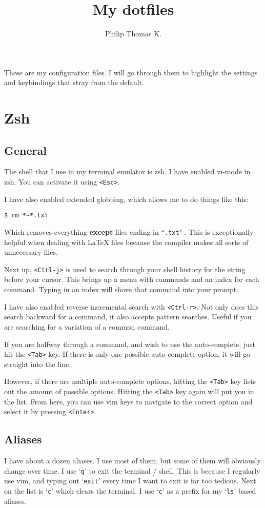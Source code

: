 \documentclass[12pt, a4paper]{article}
\title{My dotfiles}
\author{Philip Thomas K.}
\begin{document}
\maketitle

These are my configuration files.
I will go through them to highlight the settings and keybindings that stray from the default.

\section{Zsh}

\subsection{General}

The shell that I use in my terminal emulator is zsh.
I have enabled vi-mode in zsh.
You can activate it using \texttt{<Esc>}.

I have also enabled extended globbing, which allows me to do things like this:

\begin{center}
\verb|$ rm *~*.txt|
\end{center}

Which removes everything \textbf{except} files ending in ``\texttt{.txt}" .
This is exceptionally helpful when dealing with \LaTeX{} files because the compiler makes all sorts of unnecessary files.

Next up, \texttt{<Ctrl-j>} is used to search through your shell history for the string before your cursor.
This brings up a menu with commands and an index for each command.
Typing in an index will shove that command into your prompt.

I have also enabled reverse incremental search with \texttt{<Ctrl-r>}.
Not only does this search backward for a command, it also accepts pattern searches.
Useful if you are searching for a variation of a common command.

If you are halfway through a command, and wish to use the auto-complete, just hit the \texttt{<Tab>} key.
If there is only one possible auto-complete option, it will go straight into the line.

However, if there are multiple auto-complete options, hitting the \texttt{<Tab>} key lists out the amount of possible options.
Hitting the \texttt{<Tab>} key again will put you in the list.
From here, you can use vim keys to navigate to the correct option and select it by pressing \texttt{<Enter>}.

\subsection{Aliases}

I have about a dozen aliases.
I use most of them, but some of them will obviously change over time.
I use `\texttt{q}' to exit the terminal / shell.
This is because I regularly use vim, and typing out `\texttt{exit}' every time I want to exit is far too tedious.
Next on the list is `\texttt{c}' which clears the terminal.
I use `\texttt{c}' as a prefix for my `\texttt{ls}' based aliases.
\end{document}
